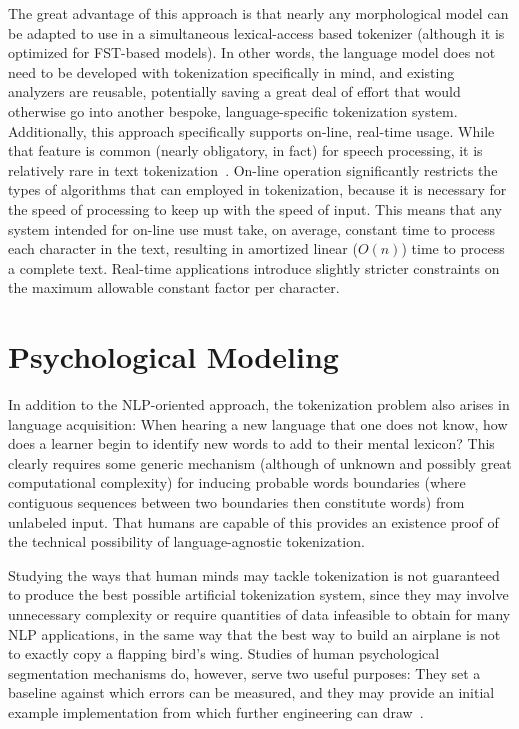The great advantage of this approach is that nearly any morphological model can be adapted to use in a simultaneous lexical-access based tokenizer (although it is optimized for FST-based models). In other words, the language model does not need to be developed with tokenization specifically in mind, and existing analyzers are reusable, potentially saving a great deal of effort that would otherwise go into another bespoke, language-specific tokenization system. Additionally, this approach specifically supports on-line, real-time usage. While that feature is common (nearly obligatory, in fact) for speech processing, it is relatively rare in text tokenization~\cite{aken11}. On-line operation significantly restricts the types of algorithms that can employed in tokenization, because it is necessary for the speed of processing to keep up with the speed of input. This means that any system intended for on-line use must take, on average, constant time to process each character in the text, resulting in amortized linear ($O(n)$) time to process a complete text. Real-time applications introduce slightly stricter constraints on the maximum allowable constant factor per character.

\section{Psychological Modeling}

In addition to the NLP-oriented approach, the tokenization problem also arises in language acquisition: When hearing a new language that one does not know, how does a learner begin to identify new words to add to their mental lexicon? This clearly requires some generic mechanism (although of unknown and possibly great computational complexity) for inducing probable words boundaries (where contiguous sequences between two boundaries then constitute words) from unlabeled input. That humans are capable of this provides an existence proof of the technical possibility of language-agnostic tokenization.

Studying the ways that human minds may tackle tokenization is not guaranteed to produce the best possible artificial tokenization system, since they may involve unnecessary complexity or require quantities of data infeasible to obtain for many NLP applications, in the same way that the best way to build an airplane is not to exactly copy a flapping bird's wing. Studies of human psychological segmentation mechanisms do, however, serve two useful purposes: They set a baseline against which errors can be measured, and they may provide an initial example implementation from which further engineering can draw~\cite{daland09}.

